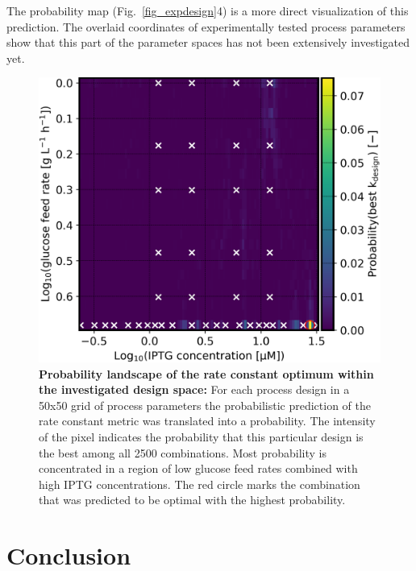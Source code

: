 \documentclass[sn-standardnature]{sn-jnl}%
\theoremstyle{thmstyleone}%
\theoremstyle{thmstyletwo}%
\theoremstyle{thmstylethree}%
\begin{document}
The probability map (Fig.~\ref{fig_expdesign}4) is a more direct visualization of this prediction.
The overlaid coordinates of experimentally tested process parameters show that this part of the parameter spaces has not been extensively investigated yet.

\begin{figure}[H]
    \centering
    \includegraphics[width=1.0\textwidth]{figures/p_best_k_design.png}
    \caption{
        \textbf{Probability landscape of the rate constant optimum within the investigated design space:}
        For each process design in a 50x50 grid of process parameters the probabilistic prediction of the rate constant metric was translated into a probability.
        The intensity of the pixel indicates the probability that this particular design is the best among all 2500 combinations.
        Most probability is concentrated in a region of low glucose feed rates combined with high IPTG concentrations.
        The red circle marks the combination that was predicted to be optimal with the highest probability.
    }
    \label{fig_kdesign_probs}
\end{figure}


\section{Conclusion}
\end{document}
